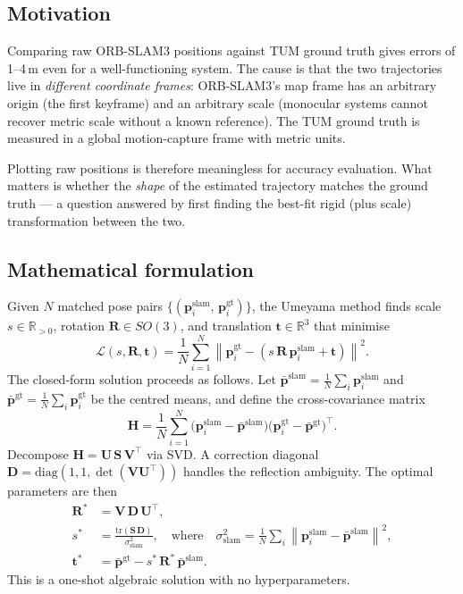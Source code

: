 \documentclass[11pt,a4paper]{article}
\begin{document}
\subsection{Motivation}

Comparing raw ORB-SLAM3 positions against TUM ground truth gives errors of
1--4\,m even for a well-functioning system. The cause is that the two
trajectories live in \emph{different coordinate frames}: ORB-SLAM3's map frame
has an arbitrary origin (the first keyframe) and an arbitrary scale (monocular
systems cannot recover metric scale without a known reference). The TUM ground
truth is measured in a global motion-capture frame with metric units.

Plotting raw positions is therefore meaningless for accuracy evaluation. What
matters is whether the \emph{shape} of the estimated trajectory matches the
ground truth --- a question answered by first finding the best-fit rigid
(plus scale) transformation between the two.

\subsection{Mathematical formulation}

Given $N$ matched pose pairs $\{(\mathbf{p}_i^{\text{slam}},\,
\mathbf{p}_i^{\text{gt}})\}$, the Umeyama method finds scale $s \in
\mathbb{R}_{>0}$, rotation $\mathbf{R} \in SO(3)$, and translation $\mathbf{t}
\in \mathbb{R}^3$ that minimise
\[
  \mathcal{L}(s, \mathbf{R}, \mathbf{t})
  = \frac{1}{N} \sum_{i=1}^{N}
    \left\| \mathbf{p}_i^{\text{gt}}
            - \left( s\,\mathbf{R}\,\mathbf{p}_i^{\text{slam}} + \mathbf{t} \right)
    \right\|^2.
\]
The closed-form solution proceeds as follows. Let
$\bar{\mathbf{p}}^{\text{slam}} = \frac{1}{N}\sum_i \mathbf{p}_i^{\text{slam}}$
and $\bar{\mathbf{p}}^{\text{gt}} = \frac{1}{N}\sum_i \mathbf{p}_i^{\text{gt}}$
be the centred means, and define the cross-covariance matrix
\[
  \mathbf{H} = \frac{1}{N}\sum_{i=1}^{N}
    \bigl(\mathbf{p}_i^{\text{slam}} - \bar{\mathbf{p}}^{\text{slam}}\bigr)
    \bigl(\mathbf{p}_i^{\text{gt}}   - \bar{\mathbf{p}}^{\text{gt}}\bigr)^\top.
\]
Decompose $\mathbf{H} = \mathbf{U}\,\mathbf{S}\,\mathbf{V}^\top$ via SVD.
A correction diagonal $\mathbf{D} = \mathrm{diag}(1,1,\det(\mathbf{V}\mathbf{U}^\top))$
handles the reflection ambiguity. The optimal parameters are then
\begin{align}
  \mathbf{R}^* &= \mathbf{V}\,\mathbf{D}\,\mathbf{U}^\top, \\[4pt]
  s^*           &= \frac{\mathrm{tr}(\mathbf{S}\,\mathbf{D})}
                         {\sigma^2_{\text{slam}}},
  \quad\text{where}\quad
  \sigma^2_{\text{slam}} = \frac{1}{N}\sum_i
    \left\|\mathbf{p}_i^{\text{slam}} - \bar{\mathbf{p}}^{\text{slam}}\right\|^2,\\[4pt]
  \mathbf{t}^* &= \bar{\mathbf{p}}^{\text{gt}}
                  - s^*\,\mathbf{R}^*\,\bar{\mathbf{p}}^{\text{slam}}.
\end{align}
This is a one-shot algebraic solution with no hyperparameters.
\end{document}
